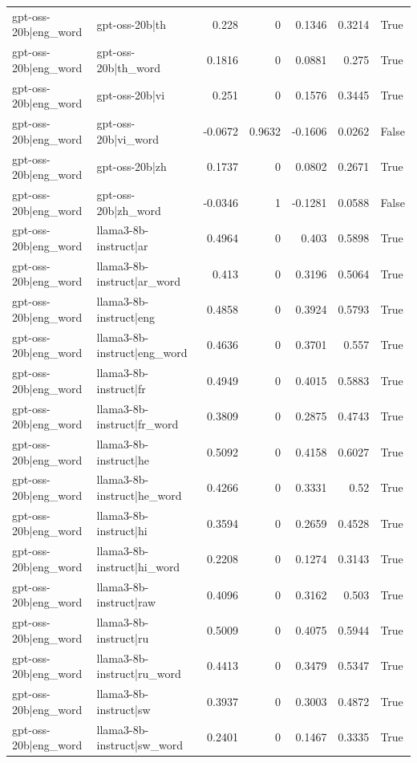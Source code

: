 \begin{table}
\begin{tabular}{l l r r r r l}
gpt-oss-20b|eng_word & gpt-oss-20b|th & 0.228 & 0 & 0.1346 & 0.3214 & True \\
gpt-oss-20b|eng_word & gpt-oss-20b|th_word & 0.1816 & 0 & 0.0881 & 0.275 & True \\
gpt-oss-20b|eng_word & gpt-oss-20b|vi & 0.251 & 0 & 0.1576 & 0.3445 & True \\
gpt-oss-20b|eng_word & gpt-oss-20b|vi_word & -0.0672 & 0.9632 & -0.1606 & 0.0262 & False \\
gpt-oss-20b|eng_word & gpt-oss-20b|zh & 0.1737 & 0 & 0.0802 & 0.2671 & True \\
gpt-oss-20b|eng_word & gpt-oss-20b|zh_word & -0.0346 & 1 & -0.1281 & 0.0588 & False \\
gpt-oss-20b|eng_word & llama3-8b-instruct|ar & 0.4964 & 0 & 0.403 & 0.5898 & True \\
gpt-oss-20b|eng_word & llama3-8b-instruct|ar_word & 0.413 & 0 & 0.3196 & 0.5064 & True \\
gpt-oss-20b|eng_word & llama3-8b-instruct|eng & 0.4858 & 0 & 0.3924 & 0.5793 & True \\
gpt-oss-20b|eng_word & llama3-8b-instruct|eng_word & 0.4636 & 0 & 0.3701 & 0.557 & True \\
gpt-oss-20b|eng_word & llama3-8b-instruct|fr & 0.4949 & 0 & 0.4015 & 0.5883 & True \\
gpt-oss-20b|eng_word & llama3-8b-instruct|fr_word & 0.3809 & 0 & 0.2875 & 0.4743 & True \\
gpt-oss-20b|eng_word & llama3-8b-instruct|he & 0.5092 & 0 & 0.4158 & 0.6027 & True \\
gpt-oss-20b|eng_word & llama3-8b-instruct|he_word & 0.4266 & 0 & 0.3331 & 0.52 & True \\
gpt-oss-20b|eng_word & llama3-8b-instruct|hi & 0.3594 & 0 & 0.2659 & 0.4528 & True \\
gpt-oss-20b|eng_word & llama3-8b-instruct|hi_word & 0.2208 & 0 & 0.1274 & 0.3143 & True \\
gpt-oss-20b|eng_word & llama3-8b-instruct|raw & 0.4096 & 0 & 0.3162 & 0.503 & True \\
gpt-oss-20b|eng_word & llama3-8b-instruct|ru & 0.5009 & 0 & 0.4075 & 0.5944 & True \\
gpt-oss-20b|eng_word & llama3-8b-instruct|ru_word & 0.4413 & 0 & 0.3479 & 0.5347 & True \\
gpt-oss-20b|eng_word & llama3-8b-instruct|sw & 0.3937 & 0 & 0.3003 & 0.4872 & True \\
gpt-oss-20b|eng_word & llama3-8b-instruct|sw_word & 0.2401 & 0 & 0.1467 & 0.3335 & True \\

\end{tabular}
\end{table}
